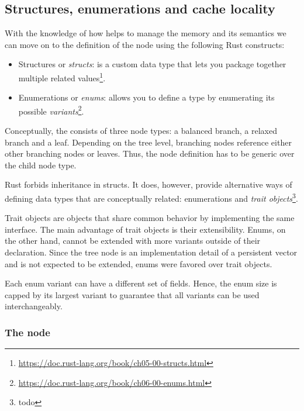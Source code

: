 
\subsection{Structures, enumerations and cache locality}
With the knowledge of how \rc{} helps to manage the memory and its semantics we can move on to the definition of the \rrbtree{} node using the following Rust constructs:
\begin{itemize}
    \item Structures or \emph{structs}: is a custom data type that lets you package together multiple related values\footnote{\url{https://doc.rust-lang.org/book/ch05-00-structs.html}}.
    \item Enumerations or \emph{enums}: allows you to define a type by enumerating its possible \emph{variants}\footnote{\url{https://doc.rust-lang.org/book/ch06-00-enums.html}}.
\end{itemize}

Conceptually, the \rrbtree{} consists of three node types: a balanced branch, a relaxed branch and a leaf. Depending on the tree level, branching nodes reference either other branching nodes or leaves. Thus, the node definition has to be generic over the child node type.

Rust forbids inheritance in structs. It does, however, provide alternative ways of defining data types that are conceptually related: enumerations and \emph{trait objects}\footnote{todo}.

Trait objects are objects that share common behavior by implementing the same interface. The main advantage of trait objects is their extensibility. Enums, on the other hand, cannot be extended with more variants outside of their declaration. Since the tree node is an implementation detail of a persistent vector and is not expected to be extended, enums were favored over trait objects.

Each enum variant can have a different set of fields. Hence, the enum size is capped by its largest variant to guarantee that all variants can be used interchangeably.

\subsubsection*{The \rrbtree{} node}

